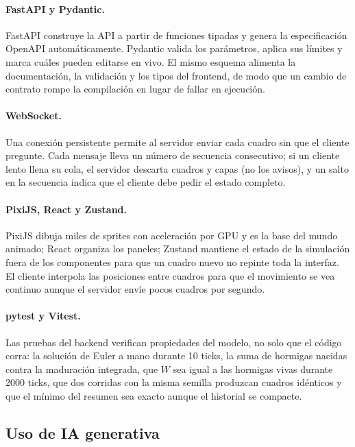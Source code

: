 \documentclass[11pt,a4paper]{article}
\begin{document}
\paragraph{FastAPI y Pydantic.} FastAPI construye la API a partir de funciones tipadas y genera la especificación OpenAPI automáticamente. Pydantic valida los parámetros, aplica sus límites y marca cuáles pueden editarse en vivo. El mismo esquema alimenta la documentación, la validación y los tipos del frontend, de modo que un cambio de contrato rompe la compilación en lugar de fallar en ejecución.

\paragraph{WebSocket.} Una conexión persistente permite al servidor enviar cada cuadro sin que el cliente pregunte. Cada mensaje lleva un número de secuencia consecutivo; si un cliente lento llena su cola, el servidor descarta cuadros y capas (no los avisos), y un salto en la secuencia indica que el cliente debe pedir el estado completo.

\paragraph{PixiJS, React y Zustand.} PixiJS dibuja miles de sprites con aceleración por GPU y es la base del mundo animado; React organiza los paneles; Zustand mantiene el estado de la simulación fuera de los componentes para que un cuadro nuevo no repinte toda la interfaz. El cliente interpola las posiciones entre cuadros para que el movimiento se vea continuo aunque el servidor envíe pocos cuadros por segundo.

\paragraph{pytest y Vitest.} Las pruebas del backend verifican propiedades del modelo, no solo que el código corra: la solución de Euler a mano durante 10 ticks, la suma de hormigas nacidas contra la maduración integrada, que $W$ sea igual a las hormigas vivas durante 2000 ticks, que dos corridas con la misma semilla produzcan cuadros idénticos y que el mínimo del resumen sea exacto aunque el historial se compacte.

\subsection{Uso de IA generativa}\label{sec:ia}
\end{document}
